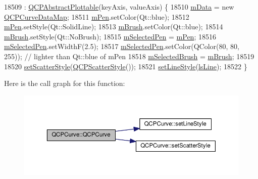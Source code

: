\begin{DoxyCode}
18509     : \hyperlink{class_q_c_p_abstract_plottable_af78a036e40db6f53a31abadc5323715a}{QCPAbstractPlottable}(keyAxis, valueAxis) \{
18510   \hyperlink{class_q_c_p_curve_a88d533e455bca96004b049e99168731b}{mData} = \textcolor{keyword}{new} \hyperlink{qcustomplot_8h_a444d37ec9cb2951b3a7fe443c34d1658}{QCPCurveDataMap};
18511   \hyperlink{class_q_c_p_abstract_plottable_a67bc0622fd1b9fa14e54c14922dcec66}{mPen}.setColor(Qt::blue);
18512   \hyperlink{class_q_c_p_abstract_plottable_a67bc0622fd1b9fa14e54c14922dcec66}{mPen}.setStyle(Qt::SolidLine);
18513   \hyperlink{class_q_c_p_abstract_plottable_a33f00674c0161c13315ab9da0895418e}{mBrush}.setColor(Qt::blue);
18514   \hyperlink{class_q_c_p_abstract_plottable_a33f00674c0161c13315ab9da0895418e}{mBrush}.setStyle(Qt::NoBrush);
18515   \hyperlink{class_q_c_p_abstract_plottable_a10619472f5d5e10e9519a599f1cf5576}{mSelectedPen} = \hyperlink{class_q_c_p_abstract_plottable_a67bc0622fd1b9fa14e54c14922dcec66}{mPen};
18516   \hyperlink{class_q_c_p_abstract_plottable_a10619472f5d5e10e9519a599f1cf5576}{mSelectedPen}.setWidthF(2.5);
18517   \hyperlink{class_q_c_p_abstract_plottable_a10619472f5d5e10e9519a599f1cf5576}{mSelectedPen}.setColor(QColor(80, 80, 255)); \textcolor{comment}{// lighter than Qt::blue of mPen}
18518   \hyperlink{class_q_c_p_abstract_plottable_aea3c0da30c7a8be23ad5f2d9bca36762}{mSelectedBrush} = \hyperlink{class_q_c_p_abstract_plottable_a33f00674c0161c13315ab9da0895418e}{mBrush};
18519 
18520   \hyperlink{class_q_c_p_curve_a55e43b44709bf50a35500644988aa706}{setScatterStyle}(\hyperlink{class_q_c_p_scatter_style}{QCPScatterStyle}());
18521   \hyperlink{class_q_c_p_curve_a4a377ec863ff81a1875c3094a6177c19}{setLineStyle}(\hyperlink{class_q_c_p_curve_a2710e9f79302152cff794c6e16cc01f1ade5822ce6fbf131d3df131795c2e1003}{lsLine});
18522 \}
\end{DoxyCode}


Here is the call graph for this function\+:\nopagebreak
\begin{figure}[H]
\begin{center}
\leavevmode
\includegraphics[width=350pt]{class_q_c_p_curve_a36de58e2652b3fa47bdf9187d421d3ce_cgraph}
\end{center}
\end{figure}


